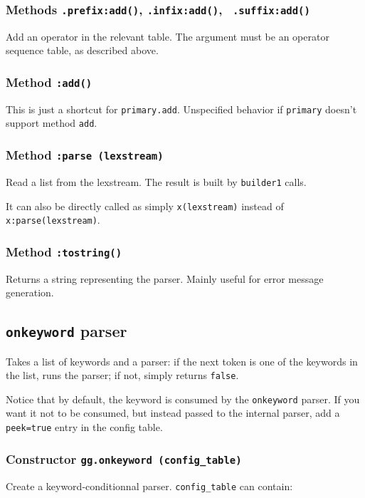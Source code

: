 \subsubsection{Methods {\tt .prefix:add()}, {\tt .infix:add()}, {\tt
    .suffix:add()}}
Add an operator in the relevant table. The argument must be an
operator sequence table, as described above.

\subsubsection{Method {\tt :add()}}
This is just a shortcut for {\tt primary.add}. Unspecified behavior if
{\tt primary} doesn't support method {\tt add}.


\subsubsection{Method {\tt :parse (lexstream)}}
Read a list from the lexstream. The result is built by \verb|builder1| calls.

It can also be directly called as simply \verb|x(lexstream)| instead of
\verb|x:parse(lexstream)|.

\subsubsection{Method {\tt :tostring()}}

Returns a string representing the parser. Mainly useful for error
message generation.

\subsection{{\tt onkeyword} parser}

Takes a list of keywords and a parser: if the next token is one of the
keywords in the list, runs the parser; if not, simply returns
\verb|false|.

Notice that by default, the keyword is consumed by the
\verb|onkeyword| parser. If you want it not to be consumed, but
instead passed to the internal parser, add a \verb|peek=true| entry in
the config table.

\subsubsection{Constructor {\tt gg.onkeyword (config\_table)}}

Create a keyword-conditionnal parser. \verb|config_table| can contain:

